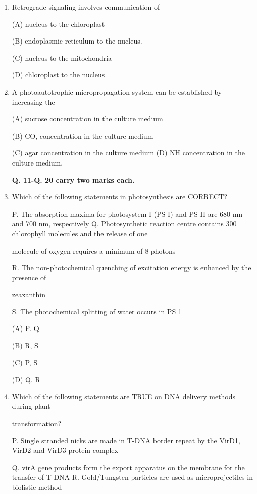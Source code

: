 \documentclass[journal]{IEEEtran}
\begin{document}
\begin{enumerate}
{(A) ESR Spectroscopy

(B) FTIR Spectroscopy

(C) Flow Cytometry

(D) X-Ray Crystallography
}
\item {Retrograde signaling involves communication of

(A) nucleus to the chloroplast

(B) endoplasmic reticulum to the nucleus.

(C) nucleus to the mitochondria

(D) chloroplast to the nucleus
}
\item {A photoautotrophic micropropagation system can be established by increasing the

(A) sucrose concentration in the culture medium

(B) CO, concentration in the culture medium


(C) agar concentration in the culture medium
(D) NH concentration in the culture medium.
}
\begin{center}
\textbf{Q. 11-Q. 20 carry two marks each.}
\end{center}
\item{Which of the following statements in photosynthesis are CORRECT?

P. The absorption maxima for photosystem I (PS I) and PS II are 680 nm and 700 nm, respectively Q. Photosynthetic reaction centre contains 300 chlorophyll molecules and the release of one

molecule of oxygen requires a minimum of 8 photons

R. The non-photochemical quenching of excitation energy is enhanced by the presence of

zeaxanthin

S. The photochemical splitting of water occurs in PS 1

(A) P. Q

(B) R, S

(C) P, S

(D) Q. R
}
\item {Which of the following statements are TRUE on DNA delivery methods during plant

transformation?

P. Single stranded nicks are made in T-DNA border repeat by the VirD1, VirD2 and VirD3 protein complex

Q. virA gene products form the export apparatus on the membrane for the transfer of T-DNA R. Gold/Tungsten particles are used as microprojectiles in biolistic method

}
\end{enumerate}
\end{document}
